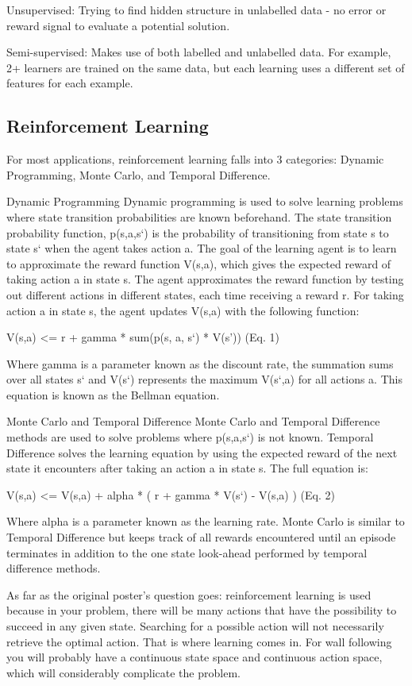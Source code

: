 \documentclass[a4paper,oneside]{report}
\begin{document}
Unsupervised: Trying to find hidden structure in unlabelled data - no error or reward signal to evaluate a potential solution.

Semi-supervised: Makes use of both labelled and unlabelled data. For example, 2+ learners are trained on the same data, but each learning uses a different set of features for each example. 

\subsection{Reinforcement Learning}

For most applications, reinforcement learning falls into 3 categories: Dynamic Programming, Monte Carlo, and Temporal Difference.

Dynamic Programming
Dynamic programming is used to solve learning problems where state transition probabilities are known beforehand. The state transition probability function, p(s,a,s`) is the probability of transitioning from state s to state s` when the agent takes action a. The goal of the learning agent is to learn to approximate the reward function V(s,a), which gives the expected reward of taking action a in state s. The agent approximates the reward function by testing out different actions in different states, each time receiving a reward r. For taking action a in state s, the agent updates V(s,a) with the following function:

V(s,a) <= r + gamma * sum(p(s, a, s`) * V(s')) (Eq. 1)

Where gamma is a parameter known as the discount rate, the summation sums over all states s` and V(s`) represents the maximum V(s`,a) for all actions a. This equation is known as the Bellman equation.

Monte Carlo and Temporal Difference
Monte Carlo and Temporal Difference methods are used to solve problems where p(s,a,s`) is not known. Temporal Difference solves the learning equation by using the expected reward of the next state it encounters after taking an action a in state s. The full equation is:

V(s,a) <= V(s,a) + alpha * ( r + gamma * V(s`) - V(s,a) ) (Eq. 2)

Where alpha is a parameter known as the learning rate. Monte Carlo is similar to Temporal Difference but keeps track of all rewards encountered until an episode terminates in addition to the one state look-ahead performed by temporal difference methods.

As far as the original poster's question goes: reinforcement learning is used because in your problem, there will be many actions that have the possibility to succeed in any given state. Searching for a possible action will not necessarily retrieve the optimal action. That is where learning comes in. For wall following you will probably have a continuous state space and continuous action space, which will considerably complicate the problem.
\end{document}
